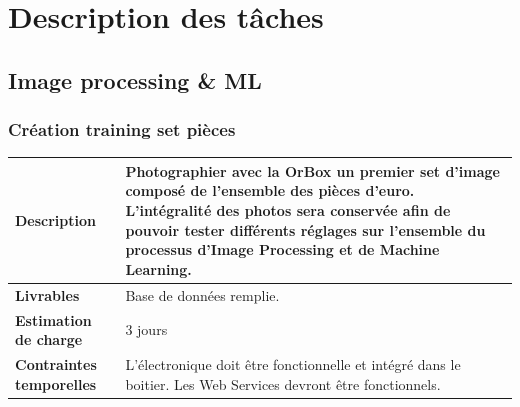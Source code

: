 \section{Description des tâches}






\subsection{Image processing \& ML}

\subsubsection{Création training set pièces}

\begin{tabularx}{13cm}{lX}
    \toprule
        \textbf{Description} &
        Photographier avec la OrBox un premier set d'image composé de l'ensemble des pièces d'euro.
        L'intégralité des photos sera conservée afin de pouvoir tester différents réglages sur l'ensemble du processus d'Image Processing et de Machine Learning. \\
    \midrule
        \textbf{Livrables} &
        Base de données remplie. \\
    \midrule
        \textbf{Estimation de charge} &
        3 jours \\
    \midrule
        \textbf{Contraintes temporelles} &
        L'électronique doit être fonctionnelle et intégré dans le boitier.
        Les Web Services devront être fonctionnels. \\
    \bottomrule
\end{tabularx}

